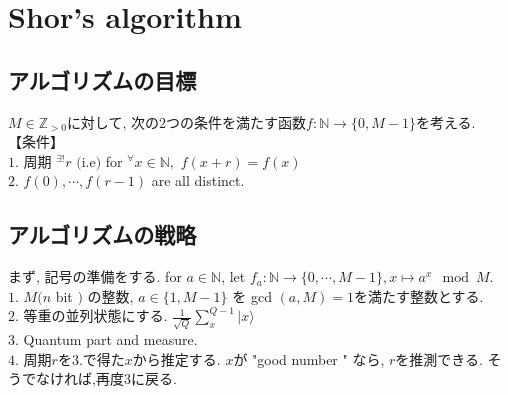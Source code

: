 \documentclass{jsarticle}
\theoremstyle{definition}
\begin{document}
\section{Shor's algorithm}
\subsection{アルゴリズムの目標}
$M \in \mathbb{Z}_{>0}$に対して, 次の$2$つの条件を満たす函数$f:\mathbb{N}\rightarrow \{0, M-1 \}$を考える.\\
【条件】\\
$1.$ 周期 $^{\exists !}r$	$($i.e$)$ for $^{\forall} x \in \mathbb{N}, $ $f(x+r)=f(x)$\\
$2.$ $f(0), \cdots , f(r-1)$ are all distinct. 

\subsection{アルゴリズムの戦略}
まず, 記号の準備をする. for $a \in \mathbb{N}$, let $f_a:\mathbb{N}\rightarrow \{ 0, \cdots , M-1 \} , x\mapsto a^x \mod M.$ \\
$1.$ $M ( n$  bit $)$ の整数,  $a \in \{1, M-1 \}$ を gcd $(a, M)=1$を満たす整数とする.\\
$2.$ 等重の並列状態にする. $\frac{1}{\sqrt{Q} } \displaystyle\sum_{x}^{Q-1}  |x  \rangle$ \\
$3.$ Quantum part and measure. \\
$4.$ 周期$r$を$3.$で得た$x$から推定する. $x$が "good number " なら, $r$を推測できる. そうでなければ,再度$3$に戻る.\\

 
\end{document}
